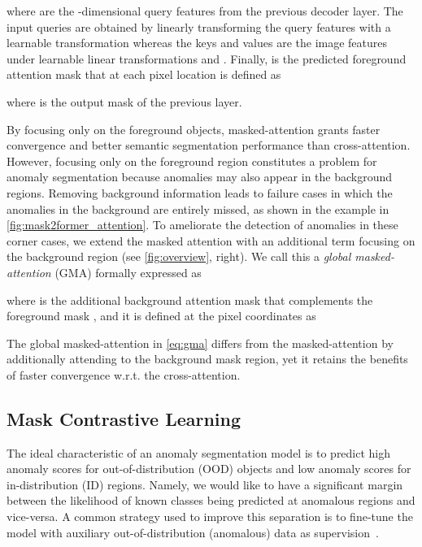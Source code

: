 \documentclass[10pt,twocolumn,letterpaper]{article}
\begin{document}
where   are the  -dimensional query features from the previous decoder layer. The input queries  are obtained by linearly transforming the query features with a learnable transformation whereas the keys and values  are the image features under learnable linear transformations  and . 
Finally,  is the predicted foreground attention mask that at each pixel location  is defined as

where  is the output mask of the previous layer. 

By focusing only on the foreground objects, masked-attention grants faster convergence and better semantic segmentation performance than cross-attention. However, focusing only on the foreground region constitutes a problem for anomaly segmentation because anomalies may also appear in the background regions. Removing background information leads to failure cases in which the anomalies in the background are entirely missed, as shown in the example in \cref{fig:mask2former_attention}. To ameliorate the detection of anomalies in these corner cases, we extend the masked attention with an additional term focusing on the background region (see \cref{fig:overview}, right). We call this a \textit{global masked-attention} (GMA) formally expressed as 

where  is the additional background attention mask that complements the foreground mask , and it is defined at the pixel coordinates  as


The global masked-attention in \cref{eq:gma} differs from the masked-attention by additionally attending to the background mask region, yet it retains the benefits of faster convergence w.r.t. the cross-attention. 





\subsection{Mask Contrastive Learning}
\label{subsec:CL}
The ideal characteristic of an anomaly segmentation model is to predict high anomaly scores for out-of-distribution (OOD) objects and low anomaly scores for in-distribution (ID) regions. Namely, we would like to have a significant margin between the likelihood of known classes being predicted at anomalous regions and vice-versa.
A common strategy used to improve this separation is to fine-tune the model with auxiliary out-of-distribution (anomalous) data as supervision~\cite{grcic2020dense,grcic2022densehybrid, blum2021fishyscapes}.  
\end{document}
